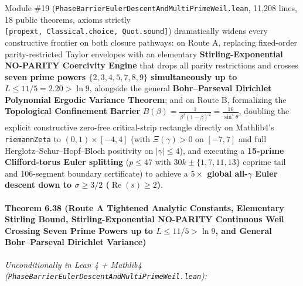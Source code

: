\documentclass[
  11pt,
]{article}
\begin{document}
Module \#19 (\texttt{PhaseBarrierEulerDescentAndMultiPrimeWeil.lean},
11,208 lines, 18 public theorems, axioms strictly
\texttt{{[}propext,\ Classical.choice,\ Quot.sound{]}}) dramatically
widens every constructive frontier on both closure pathways: on Route A,
replacing fixed-order parity-restricted Taylor envelopes with an
elementary \textbf{Stirling-Exponential NO-PARITY Coercivity Engine}
that drops all parity restrictions and crosses \textbf{seven prime
powers \(\{2, 3, 4, 5, 7, 8, 9\}\) simultaneously up to
\(L \le 11/5 = 2.20 > \ln 9\)}, alongside the general
\textbf{Bohr--Parseval Dirichlet Polynomial Ergodic Variance Theorem};
and on Route B, formalizing the \textbf{Topological Confinement Barrier}
\(B(\beta) = \frac{1}{\beta^2(1-\beta)^2} = \frac{16}{\sin^4\theta}\),
doubling the explicit constructive zero-free critical-strip rectangle
directly on Mathlib4's \texttt{riemannZeta} to \((0, 1) \times [-4, 4]\)
(with \(\Xi(\gamma) > 0\) on \([-7, 7]\) and full
Herglotz--Schur--Hopf--Bloch positivity on \(|\gamma| \le 4\)), and
executing a \textbf{15-prime Clifford-torus Euler splitting}
(\(p \le 47\) with \(30k \pm \{1, 7, 11, 13\}\) coprime tail and
106-segment boundary certificate) to achieve a \textbf{\(5\times\)
global all-\(\gamma\) Euler descent down to \(\sigma \ge 3/2\)
(\(\operatorname{Re}(s) \ge 2\))}.

\paragraph{\texorpdfstring{Theorem 6.38 (Route A Tightened Analytic
Constants, Elementary Stirling Bound, Stirling-Exponential NO-PARITY
Continuous Weil Crossing Seven Prime Powers up to
\(L \le 11/5 > \ln 9\), and General Bohr--Parseval Dirichlet
Variance)}{Theorem 6.38 (Route A Tightened Analytic Constants, Elementary Stirling Bound, Stirling-Exponential NO-PARITY Continuous Weil Crossing Seven Prime Powers up to L \textbackslash le 11/5 \textgreater{} \textbackslash ln 9, and General Bohr--Parseval Dirichlet Variance)}}\label{theorem-6.38-route-a-tightened-analytic-constants-elementary-stirling-bound-stirling-exponential-no-parity-continuous-weil-crossing-seven-prime-powers-up-to-l-le-115-ln-9-and-general-bohrparseval-dirichlet-variance}

\emph{Unconditionally in Lean 4 + Mathlib4
(\texttt{PhaseBarrierEulerDescentAndMultiPrimeWeil.lean}):}
\end{document}
